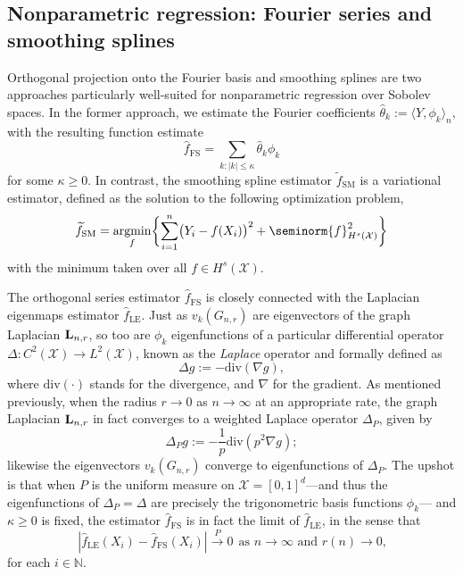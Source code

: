 \documentclass{article}
\newcommand{\abs}[1]{\left \lvert #1 \right \rvert}
\newcommand{\1}{\mathbf{1}}
\DeclareMathOperator*{\argmin}{argmin}
\newcommand{\Lap}{{\bf L}}
\newcommand{\Xset}{\mathcal{X}}
\newcommand{\Leb}{L}
\newcommand{\dotp}[2]{\langle #1, #2 \rangle}
\newcommand{\wt}[1]{\widetilde{#1}}
\newcommand{\wh}[1]{\widehat{#1}}
\newcommand{\LE}{\mathrm{LE}}
\newcommand{\SM}{\mathrm{SM}}
\newcommand{\OS}{\mathrm{FS}}
\theoremstyle{alden}
\theoremstyle{aldenthm}
\theoremstyle{definition}
\theoremstyle{remark}
\begin{document}
\subsection{Nonparametric regression: Fourier series and smoothing splines}
\label{subsec:continuum_methods}
Orthogonal projection onto the Fourier basis and smoothing splines are two approaches particularly well-suited for nonparametric regression over Sobolev spaces. In the former approach, we estimate the Fourier coefficients $\wh{\theta}_k := \dotp{Y}{\phi_k}_n$, with the resulting function estimate
\begin{equation}
\label{eqn:orthogonal_series}
\wh{f}_{\OS} = \sum_{k: \abs{k} \leq \kappa} \wh{\theta}_k \phi_k
\end{equation}
for some $\kappa \geq 0$. In contrast, the smoothing spline estimator $\wt{f}_{\SM}$ is a variational estimator, defined as the solution to the following optimization problem,
\begin{equation}
\label{eqn:smoothing_spline}
\wt{f}_{\SM} = \argmin_{f} \biggl\{\sum_{i = 1}^{n} \bigl(Y_i - f(X_i)\bigr)^2 + \seminorm{f}_{H^{s}(\Xset)}^2\biggr\}
\end{equation}
with the minimum taken over all $f \in H^s(\Xset)$.

The orthogonal series estimator $\wh{f}_{\OS}$ is closely connected with the Laplacian eigenmaps estimator $\wh{f}_{\LE}$. Just as $v_k(G_{n,r})$ are eigenvectors of the graph Laplacian $\Lap_{n,r}$, so too are $\phi_k$ eigenfunctions of a particular differential operator $\Delta: C^2(\Xset) \to \Leb^2(\Xset)$, known as the \emph{Laplace} operator and formally defined as
\begin{equation}
\label{eqn:laplace_operator}
\Delta g := -\mathrm{div}(\nabla g),
\end{equation}
where $\mathrm{div}(\cdot)$ stands for the divergence, and $\nabla$ for the gradient. As mentioned previously, when the radius $r \to 0$ as $n \to \infty$ at an appropriate rate, the graph Laplacian $\Lap_{n,r}$ in fact converges to a weighted Laplace operator $\Delta_P$, given by
\begin{equation}
\label{eqn:laplace_operator_weighted}
\Delta_{P} g := -\frac{1}{p}\mathrm{div}(p^2 \nabla g);
\end{equation}
likewise the eigenvectors $v_k(G_{n,r})$ converge to eigenfunctions of $\Delta_{P}$. The upshot is that when $P$ is the uniform measure on $\Xset = [0,1]^d$---and thus the eigenfunctions of $\Delta_P = \Delta$ are precisely the trigonometric basis functions $\phi_k$--- and $\kappa \geq 0$ is fixed, the estimator $\wh{f}_{\OS}$ is in fact the limit of $\wh{f}_{\LE}$, in the sense that
\begin{equation}
\label{eqn:laplacian_eigenmaps_consistency}
\abs{\wh{f}_{\LE}(X_i) - \wh{f}_{\OS}(X_i)} \overset{P}{\to} 0~~\textrm{as $n \to \infty$ and $r(n) \to 0$,}
\end{equation} 
for each $i \in \mathbb{N}$.
\end{document}
